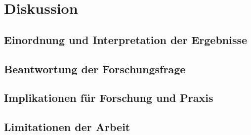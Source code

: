\chapter{Diskussion}
\label{sec:Diskussion}

\section{Einordnung und Interpretation der Ergebnisse}
\label{sec:Interpretation}

\section{Beantwortung der Forschungsfrage}
\label{sec:BeantwortungForschungsfrage}

\section{Implikationen für Forschung und Praxis}
\label{sec:Implikationen}

\section{Limitationen der Arbeit}
\label{sec:Limitationen}
